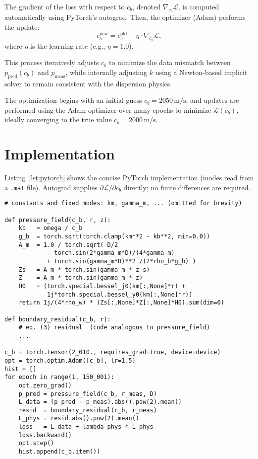 \documentclass[conference]{IEEEtran}
\begin{document}
The gradient of the loss with respect to \( c_b \), denoted \( \nabla_{c_b} \mathcal{L} \), is computed automatically using PyTorch’s autograd. Then, the optimizer (Adam) performs the update:
\[
c_b^{\text{new}} = c_b^{\text{old}} - \eta \cdot \nabla_{c_b} \mathcal{L},
\]
where \( \eta \) is the learning rate (e.g., \( \eta = 1.0 \)).

This process iteratively adjusts \( c_b \) to minimize the data mismatch between \( p_{\text{pred}}(c_b) \) and \( p_{\text{meas}} \), while internally adjusting \( k \) using a Newton-based implicit solver to remain consistent with the dispersion physics.


The optimization begins with an initial guess \( c_b = 2050\, \text{m/s} \), and updates are performed using the Adam optimizer over many epochs to minimize \( \mathcal{L}(c_b) \), ideally converging to the true value \( c_b = 2000\, \text{m/s} \).




\section{Implementation}

Listing~\ref{lst:pytorch} shows the concise PyTorch implementation (modes
read from a \texttt{.mat} file).  Autograd supplies
\(\partial\mathcal{L}/\partial c_b\) directly; no finite differences are
required.

\begin{lstlisting}[caption={PyTorch code fragment (simplified).},
                   label=lst:pytorch]
# constants and fixed modes: km, gamma_m, ... (omitted for brevity)

def pressure_field(c_b, r, z):
    kb   = omega / c_b
    g_b  = torch.sqrt(torch.clamp(km**2 - kb**2, min=0.0))
    A_m  = 1.0 / torch.sqrt( D/2
            - torch.sin(2*gamma_m*D)/(4*gamma_m)
            + torch.sin(gamma_m*D)**2 /(2*rho_b*g_b) )
    Zs   = A_m * torch.sin(gamma_m * z_s)
    Z    = A_m * torch.sin(gamma_m * z)
    H0   = (torch.special.bessel_j0(km[:,None]*r) +
            1j*torch.special.bessel_y0(km[:,None]*r))
    return 1j/(4*rho_w) * (Zs[:,None]*Z[:,None]*H0).sum(dim=0)

def boundary_residual(c_b, r):
    # eq. (3) residual  (code analogous to pressure_field)
    ...

c_b = torch.tensor(2_010., requires_grad=True, device=device)
opt = torch.optim.Adam([c_b], lr=1.5)
hist = []
for epoch in range(1, 150_001):
    opt.zero_grad()
    p_pred = pressure_field(c_b, r_meas, D)
    L_data = (p_pred - p_meas).abs().pow(2).mean()
    resid  = boundary_residual(c_b, r_meas)
    L_phys = resid.abs().pow(2).mean()
    loss   = L_data + lambda_phys * L_phys
    loss.backward()
    opt.step()
    hist.append(c_b.item())
\end{lstlisting}
\end{document}
